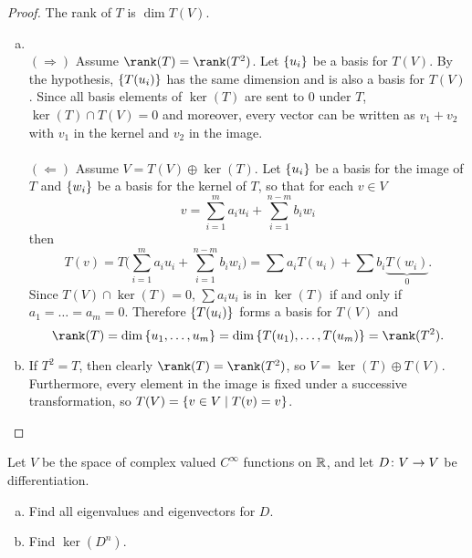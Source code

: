 \documentclass{article}
\begin{document}
\begin{proof}
  The rank of $T$ is $\dim T(V)$. %
  \begin{enumerate}[(a)]
    \item ~\\ %
      $(\Longrightarrow)$ Assume $\rank(T) = \rank(T^2)$.
      Let $\left\{ u_i \right\}$ be a basis for $T(V)$. By the hypothesis, $\left\{ T(u_i) \right\}$
      has the same dimension and is also a basis for $T(V)$. Since all basis
      elements of $\ker(T)$ are sent to $0$ under $T$,
      $\ker(T) \cap T(V) = 0$ and moreover, every vector can be written as
      $v_1 + v_2$ with $v_1$ in the kernel and $v_2$ in the image.
      \\~\\
      $(\Longleftarrow)$ Assume $V = T(V) \oplus \ker(T)$. Let $\left\{ u_i \right\}$
      be a basis for the image of $T$ and $\left\{ w_i \right\}$ be a basis for the kernel
      of $T$, so that for each $v \in V$ \[
        v = \sum_{i=1}^{m} a_iu_i + \sum_{i=1}^{n-m} b_iw_i
      \] then \[
        T(v) = T\bigl(\sum_{i=1}^{m} a_iu_i + \sum_{i=1}^{n-m} b_iw_i\bigr) = \sum a_iT(u_i) + \sum b_i\underbrace{T(w_i)}_0.
      \] Since $T(V) \cap \ker(T) = 0$, $\sum a_iu_i$ is in $\ker(T)$ if and
      only if $a_1 = \hdots = a_m = 0$. Therefore $\left\{ T(u_i) \right\}$ forms a basis for
      $T(V)$ and \[
        \rank(T) = \dim\set{u_1, \hdots, u_m} = \dim\set{T(u_1), \hdots, T(u_m)} = \rank(T^2).
      \]
    \item If $T^2 = T$, then clearly $\rank(T) = \rank(T^2)$, so
    $V = \ker(T) \oplus T(V)$. Furthermore, every element in the image is fixed
    under a successive transformation, so $T(V) = \left\{ v \in V \mid T(v) = v \right\}$.
  \end{enumerate}
\end{proof}

\begin{problem}{4} %
  Let $V$ be the space of complex valued $C^\infty$ functions on $\mathbb R$, and let
  $D \colon V \rightarrow V$ be differentiation. \begin{enumerate}[(a)]
    \item Find all eigenvalues and eigenvectors for $D$.
    \item Find $\ker(D^n)$.
  \end{enumerate}
\end{problem}
\end{document}

